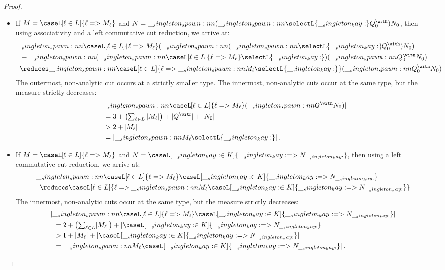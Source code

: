 \begin{proof}
\begin{description}
\begin{itemize}
    \item If $M = \caseL[\ell \in L]{\ell => M_{\ell}}$ and $N = \spawn{(\spawn{\selectL{\kay}}{Q^{\with}_0})}{N_0}$, then using associativity and a left commutative cut reduction, we arrive at:
      \begin{align*}
        \MoveEqLeft[0.5]
        \spawn{\caseL[\ell \in L]{\ell => M_{\ell}}}{(\spawn{(\spawn{\selectL{\kay}}{Q^{\with}_0})}{N_0})} \\
          &\equiv \spawn{(\spawn{\caseL[\ell \in L]{\ell => M_{\ell}}}{\selectL{\kay}})}{(\spawn{Q^{\with}_0}{N_0})} \\
          &\reduces \spawn{\caseL[\ell \in L]{\ell => \spawn{M_{\ell}}{\selectL{\kay}}}}{(\spawn{Q^{\with}_0}{N_0})}
      \end{align*}
      The outermost, non-analytic cut occurs at a strictly smaller type.
      The innermost, non-analytic cuts occur at the same type, but the measure strictly decreases:
      \begin{align*}
        \MoveEqLeft[0.5]
        \meas{\spawn{\caseL[\ell \in L]{\ell => M_{\ell}}}{(\spawn{Q^{\with}}{N_0})}} \\
          &= 3 + \bigl({\textstyle \sum_{\ell \in L}{\meas{M_{\ell}}}}\bigr) + \qmeas{Q^{\with}} + \meas{N_0} \\
          &> 2 + \meas{M_{\ell}} \\
          &=\meas{\spawn{M_{\ell}}{\selectL{\kay}}}
        \mathrlap{\,.}
      \end{align*}

    \item If $M = \caseL[\ell \in L]{\ell => M_{\ell}}$ and $N = \caseL[\kay \in K]{\kay => N_{\kay}}$, then using a left commutative cut reduction, we arrive at:
      \begin{align*}
        \MoveEqLeft[0.5]
        \spawn{\caseL[\ell \in L]{\ell => M_{\ell}}}
              {\caseL[\kay \in K]{\kay => N_{\kay}}} \\
          &\reduces \caseL[\ell \in L]{\ell => \spawn{M_{\ell}}{\caseL[\kay \in K]{\kay => N_{\kay}}}}
      \end{align*}
      The innermost, non-analytic cuts occur at the same type, but the measure strictly decreases:
      \begin{align*}
        \MoveEqLeft[0.5]
        \meas{\spawn{\caseL[\ell \in L]{\ell => M_{\ell}}}
                    {\caseL[\kay \in K]{\kay => N_{\kay}}}} \\
          &= 2 + \bigl({\textstyle \sum_{\ell \in L} \meas{M_{\ell}}}\bigr) + \meas{\caseL[\kay \in K]{\kay => N_{\kay}}} \\
          &> 1 + \meas{M_{\ell}} + \meas{\caseL[\kay \in K]{\kay => N_{\kay}}} \\
          &= \meas{\spawn{M_{\ell}}{\caseL[\kay \in K]{\kay => N_{\kay}}}}
        \,.
      \end{align*}


\end{itemize}
\end{description}
\end{proof}
